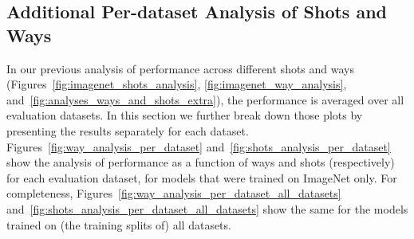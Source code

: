 \documentclass{article} \usepackage{iclr2020_conference,times}
\begin{document}
\subsection{Additional Per-dataset Analysis of Shots and Ways}
In our previous analysis of performance across different shots and ways
(Figures~\ref{fig:imagenet_shots_analysis}, \ref{fig:imagenet_way_analysis},
and~\ref{fig:analyses_ways_and_shots_extra}), the performance is averaged over
all evaluation datasets. In this section we further break down those plots by
presenting the results separately for each dataset.
Figures~\ref{fig:way_analysis_per_dataset}
and~\ref{fig:shots_analysis_per_dataset} show the analysis of performance as a
function of ways and shots (respectively) for each evaluation dataset, for
models that were trained on ImageNet only. For completeness,
Figures~\ref{fig:way_analysis_per_dataset_all_datasets}
and~\ref{fig:shots_analysis_per_dataset_all_datasets} show the same for the
models trained on (the training splits of) all datasets.
\end{document}

